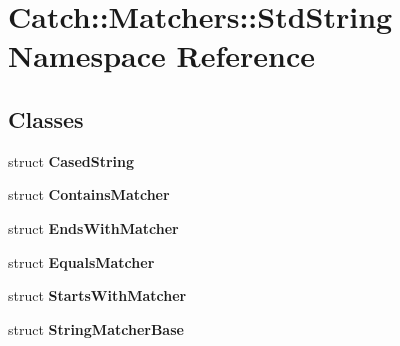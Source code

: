 \section{Catch\+:\+:Matchers\+:\+:Std\+String Namespace Reference}
\label{namespace_catch_1_1_matchers_1_1_std_string}
\subsection*{Classes}
\begin{DoxyCompactItemize}
\item 
struct \textbf{ Cased\+String}
\item 
struct \textbf{ Contains\+Matcher}
\item 
struct \textbf{ Ends\+With\+Matcher}
\item 
struct \textbf{ Equals\+Matcher}
\item 
struct \textbf{ Starts\+With\+Matcher}
\item 
struct \textbf{ String\+Matcher\+Base}
\end{DoxyCompactItemize}

